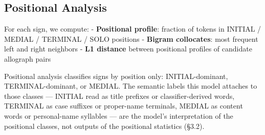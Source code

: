 \documentclass[11pt]{article}
\begin{document}
\subsection{Positional Analysis}\label{positional-analysis}

For each sign, we compute: - \textbf{Positional profile}: fraction of
tokens in INITIAL / MEDIAL / TERMINAL / SOLO positions - \textbf{Bigram
collocates}: most frequent left and right neighbors - \textbf{L1
distance} between positional profiles of candidate allograph pairs

Positional analysis classifies signs by position only: INITIAL-dominant,
TERMINAL-dominant, or MEDIAL. The semantic labels this model attaches to
those classes --- INITIAL read as title prefixes or classifier-derived
words, TERMINAL as case suffixes or proper-name terminals, MEDIAL as
content words or personal-name syllables --- are the model's
interpretation of the positional classes, not outputs of the positional
statistics (§3.2).
\end{document}
